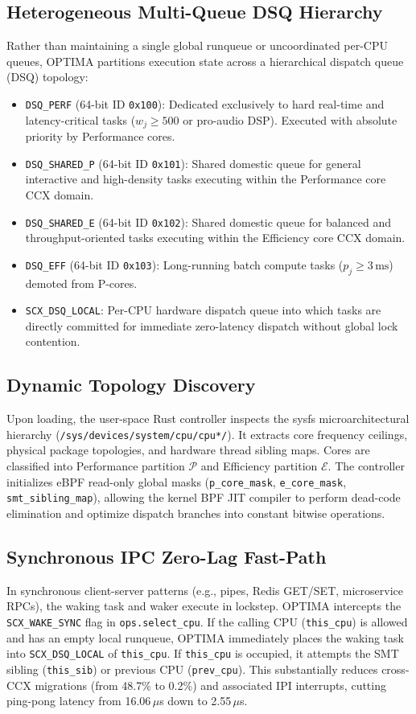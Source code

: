 \documentclass[letterpaper,twocolumn,10pt]{article}
\begin{document}
\subsection{Heterogeneous Multi-Queue DSQ Hierarchy}
Rather than maintaining a single global runqueue or uncoordinated per-CPU queues, OPTIMA partitions execution state across a hierarchical dispatch queue (DSQ) topology:
\begin{itemize}
    \item \texttt{DSQ\_PERF} (64-bit ID \texttt{0x100}): Dedicated exclusively to hard real-time and latency-critical tasks ($w_j \ge 500$ or pro-audio DSP). Executed with absolute priority by Performance cores.
    \item \texttt{DSQ\_SHARED\_P} (64-bit ID \texttt{0x101}): Shared domestic queue for general interactive and high-density tasks executing within the Performance core CCX domain.
    \item \texttt{DSQ\_SHARED\_E} (64-bit ID \texttt{0x102}): Shared domestic queue for balanced and throughput-oriented tasks executing within the Efficiency core CCX domain.
    \item \texttt{DSQ\_EFF} (64-bit ID \texttt{0x103}): Long-running batch compute tasks ($p_j \ge 3\,\text{ms}$) demoted from P-cores.
    \item \texttt{SCX\_DSQ\_LOCAL}: Per-CPU hardware dispatch queue into which tasks are directly committed for immediate zero-latency dispatch without global lock contention.
\end{itemize}

\subsection{Dynamic Topology Discovery}
Upon loading, the user-space Rust controller inspects the sysfs microarchitectural hierarchy (\texttt{/sys/devices/system/cpu/cpu*/}). It extracts core frequency ceilings, physical package topologies, and hardware thread sibling maps. Cores are classified into Performance partition $\mathcal{P}$ and Efficiency partition $\mathcal{E}$. The controller initializes eBPF read-only global masks (\texttt{p\_core\_mask}, \texttt{e\_core\_mask}, \texttt{smt\_sibling\_map}), allowing the kernel BPF JIT compiler to perform dead-code elimination and optimize dispatch branches into constant bitwise operations.

\subsection{Synchronous IPC Zero-Lag Fast-Path}
In synchronous client-server patterns (e.g., pipes, Redis GET/SET, microservice RPCs), the waking task and waker execute in lockstep. OPTIMA intercepts the \texttt{SCX\_WAKE\_SYNC} flag in \texttt{ops.select\_cpu}. If the calling CPU (\texttt{this\_cpu}) is allowed and has an empty local runqueue, OPTIMA immediately places the waking task into \texttt{SCX\_DSQ\_LOCAL} of \texttt{this\_cpu}. If \texttt{this\_cpu} is occupied, it attempts the SMT sibling (\texttt{this\_sib}) or previous CPU (\texttt{prev\_cpu}). This substantially reduces cross-CCX migrations (from 48.7\% to 0.2\%) and associated IPI interrupts, cutting ping-pong latency from 16.06\,$\mu$s down to 2.55\,$\mu$s.
\end{document}
